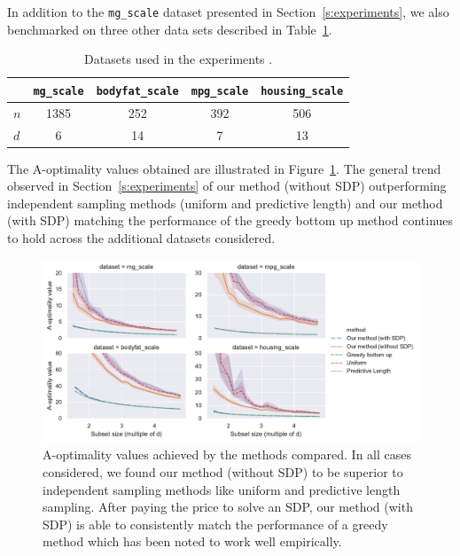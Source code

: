 In addition to the \texttt{mg\_scale} dataset presented in
Section~\ref{s:experiments}, we also benchmarked on three other data sets
described in Table~\ref{tab:libsvm-datasets}.
\begin{table}[ht]
  \centering
  \caption{Datasets used in the experiments \citep{libsvm}.}
  \label{tab:libsvm-datasets}
  \begin{tabular}[t]{lcccc}
    \toprule
        & \texttt{mg\_scale} & \texttt{bodyfat\_scale} & \texttt{mpg\_scale} & \texttt{housing\_scale} \\
    \midrule
    $n$ & 1385               & 252                     & 392                 & 506                     \\
    $d$ & 6                  & 14                      & 7                   & 13                      \\
    \bottomrule
  \end{tabular}
\end{table}

The A-optimality values obtained are illustrated in Figure~\ref{f:obj-grid}.
The general trend observed in Section~\ref{s:experiments} of our method
(without SDP) outperforming independent sampling methods (uniform and
predictive length) and our method (with SDP) matching the performance of the
greedy bottom up method continues to hold across the additional datasets considered.

\begin{figure}[htpb]
  \centering
  \includegraphics[width=\textwidth]{design/bayesian_figures/obj_grid.pdf}
  \caption{A-optimality values achieved by the methods compared. In all cases
    considered, we found our method (without SDP) to be superior to independent
    sampling methods like uniform and predictive length sampling. After paying the price
    to solve an SDP, our method (with SDP) is able to consistently match the performance
    of a greedy method which has been noted
    \citep{chamon2017approximate} to work well empirically.}
  \label{f:obj-grid}
\end{figure}

